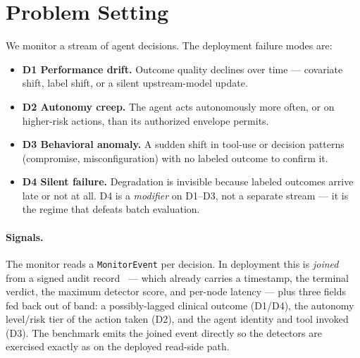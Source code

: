 \documentclass[11pt]{article}
\begin{document}
\section{Problem Setting}\label{sec:problem}
We monitor a stream of agent decisions. The deployment failure modes are:

\begin{itemize}
  \item \textbf{D1 Performance drift.} Outcome quality declines over time --- covariate
  shift, label shift, or a silent upstream-model update.
  \item \textbf{D2 Autonomy creep.} The agent acts autonomously more often, or on
  higher-risk actions, than its authorized envelope permits.
  \item \textbf{D3 Behavioral anomaly.} A sudden shift in tool-use or decision patterns
  (compromise, misconfiguration) with no labeled outcome to confirm it.
  \item \textbf{D4 Silent failure.} Degradation is invisible because labeled outcomes
  arrive late or not at all. D4 is a \emph{modifier} on D1--D3, not a separate stream ---
  it is the regime that defeats batch evaluation.
\end{itemize}

\paragraph{Signals.} The monitor reads a \texttt{MonitorEvent} per decision. In deployment
this is \emph{joined} from a signed audit record~\cite{tamperaudit2026} --- which already
carries a timestamp, the terminal verdict, the maximum detector score, and per-node
latency --- plus three fields fed back out of band: a possibly-lagged clinical outcome
(D1/D4), the autonomy level/risk tier of the action taken (D2), and the agent identity and
tool invoked (D3). The benchmark emits the joined event directly so the detectors are
exercised exactly as on the deployed read-side path.
\end{document}
